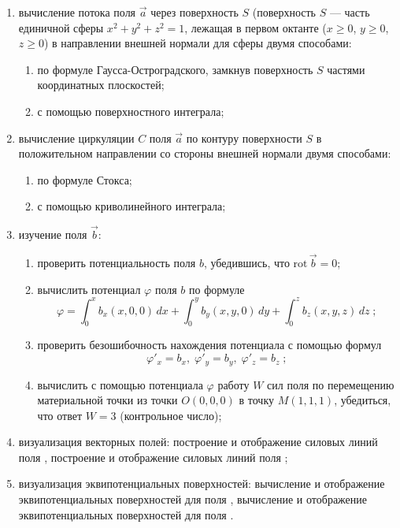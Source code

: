 \documentclass[14pt,a4paper,final]{extreport}
\begin{document}
\begin{enumerate}[label=\asbuk*),ref=\asbuk*]
	\item вычисление потока поля \( \vec a \) через поверхность \( S \) (поверхность \( S \) --- часть единичной сферы \(x^2 + y^2 + z^2 = 1 \), лежащая в первом октанте (\( x \geq 0 \), \( y \geq 0 \), \( z \geq 0 \)) в направлении внешней нормали для сферы двумя способами:
	\begin{enumerate}[label=\arabic*.]
		\item по формуле Гаусса-Остроградского, замкнув поверхность \( S \) частями координатных плоскостей;
		\item с помощью поверхностного интеграла;
	\end{enumerate}
	
	\item вычисление циркуляции \( C \) поля \( \vec a \) по контуру поверхности \( S \) в положительном направлении со стороны внешней нормали двумя способами:
	\begin{enumerate}[label=\arabic*.]
		\item по формуле Стокса;
		\item с помощью криволинейного интеграла;
	\end{enumerate}
	
	\item изучение поля \( \vec b \):
	\begin{enumerate}[label=\arabic*.]
		\item проверить потенциальность поля \( b \), убедившись, что \( \mathrm{rot} \, \vec b = 0 \);
		\item вычислить потенциал \( \varphi \) поля \( b \) по формуле \[ \varphi = \int_0^x{b_x(x,0,0)\,dx} + \int_0^y{b_y(x,y,0)\,dy} +\int_0^z{b_z(x,y,z)\,dz}\;; \]
		\item проверить безошибочность нахождения потенциала с помощью формул \[ \varphi'_x = b_x\mathrm{,}\;\varphi'_y = b_y\mathrm{,}\;\varphi'_z = b_z\;; \]
		\item вычислить с помощью потенциала \( \varphi \) работу \( W \) сил поля по перемещению материальной точки из точки \(O(0,0,0) \) в точку \( M(1,1,1) \), убедиться, что ответ \( W = 3 \) (контрольное число);
	\end{enumerate}
	
	\item визуализация векторных полей: построение и отображение силовых линий поля \fieldA, построение и отображение силовых линий поля \fieldB;
	
	\item визуализация эквипотенциальных поверхностей: вычисление и отображение эквипотенциальных поверхностей для поля \fieldA, вычисление и отображение эквипотенциальных поверхностей для поля \fieldB.
\end{enumerate}
\end{document}
